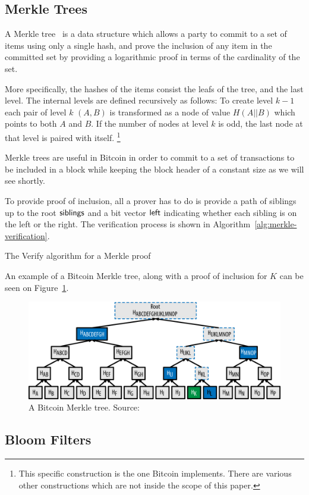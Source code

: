 \subsection{\label{sec:merkle-trees}Merkle Trees}
A Merkle tree~\cite{merkle} is a data structure which allows a party to commit to a set of items using only a single hash, and prove the inclusion of any item in the committed set by providing a logarithmic proof in terms of the cardinality of the set.

More specifically, the hashes of the items consist the leafs of the tree, and the last level. The internal levels are defined recursively as follows: To create level $k-1$ each pair of level $k$ $(A, B)$ is transformed as a node of value $H(A || B)$ which points to both $A$ and $B$. If the number of nodes at level $k$ is odd, the last node at that level is paired with itself.
\footnote{This specific construction is the one Bitcoin implements. There are various other constructions which are not inside the scope of this paper.}

Merkle trees are useful in Bitcoin in order to commit to a set of transactions to be included in a block while keeping the block header of a constant size as we will see shortly.

To provide proof of inclusion, all a prover has to do is provide a path of siblings up to the root $\sf{siblings}$ and a bit vector $\sf{left}$ indicating whether each sibling is on the left or the right. The verification process is shown in Algorithm~\ref{alg:merkle-verification}.

\begin{algorithm}[H]
  \caption{\label{alg:merkle-verification}The \textsf{Verify} algorithm
    for a Merkle proof}
    \begin{algorithmic}[1]
              \Else
              \EndIf
            \EndWhile
            \State{}
        \EndFunction
    \end{algorithmic}
\end{algorithm}

An example of a Bitcoin Merkle tree, along with a proof of inclusion for $K$ can be seen on Figure~\ref{fig:merkletree}.

\begin{figure}
  \centering
  \includegraphics[width=0.9\columnwidth,keepaspectratio]{figures/merkle-tree-proof.png}
  \caption{A Bitcoin Merkle tree. Source:~\cite{mastering}}
  \label{fig:merkletree}
\end{figure}

\subsection{Bloom Filters}
